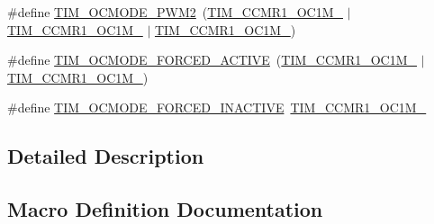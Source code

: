 \begin{DoxyCompactItemize}
\item 
\#define \hyperlink{group___t_i_m___output___compare__and___p_w_m__modes_ga88ce4251743c2c07e19fdd5a0a310580}{T\+I\+M\+\_\+\+O\+C\+M\+O\+D\+E\+\_\+\+P\+W\+M2}~(\hyperlink{group___peripheral___registers___bits___definition_gac024f6b9972b940925ab5786ee38701b}{T\+I\+M\+\_\+\+C\+C\+M\+R1\+\_\+\+O\+C1\+M\+\_} $\vert$ \hyperlink{group___peripheral___registers___bits___definition_ga8b5f6ec25063483641d6dc065d96d2b5}{T\+I\+M\+\_\+\+C\+C\+M\+R1\+\_\+\+O\+C1\+M\+\_} $\vert$ \hyperlink{group___peripheral___registers___bits___definition_ga410a4752a98081bad8ab3f72b28e7c5f}{T\+I\+M\+\_\+\+C\+C\+M\+R1\+\_\+\+O\+C1\+M\+\_})
\item 
\#define \hyperlink{group___t_i_m___output___compare__and___p_w_m__modes_ga0a78cecaf884a89963e2a8e6af7e6128}{T\+I\+M\+\_\+\+O\+C\+M\+O\+D\+E\+\_\+\+F\+O\+R\+C\+E\+D\+\_\+\+A\+C\+T\+I\+VE}~(\hyperlink{group___peripheral___registers___bits___definition_gac024f6b9972b940925ab5786ee38701b}{T\+I\+M\+\_\+\+C\+C\+M\+R1\+\_\+\+O\+C1\+M\+\_} $\vert$ \hyperlink{group___peripheral___registers___bits___definition_ga410a4752a98081bad8ab3f72b28e7c5f}{T\+I\+M\+\_\+\+C\+C\+M\+R1\+\_\+\+O\+C1\+M\+\_})
\item 
\#define \hyperlink{group___t_i_m___output___compare__and___p_w_m__modes_ga4572f724ce30ce45557f1dc5141afb3e}{T\+I\+M\+\_\+\+O\+C\+M\+O\+D\+E\+\_\+\+F\+O\+R\+C\+E\+D\+\_\+\+I\+N\+A\+C\+T\+I\+VE}~\hyperlink{group___peripheral___registers___bits___definition_gac024f6b9972b940925ab5786ee38701b}{T\+I\+M\+\_\+\+C\+C\+M\+R1\+\_\+\+O\+C1\+M\+\_}
\end{DoxyCompactItemize}


\subsection{Detailed Description}


\subsection{Macro Definition Documentation}
\mbox{\label{group___t_i_m___output___compare__and___p_w_m__modes_ga111d1023e3ac6ef5544775c3863b4b12}} 
